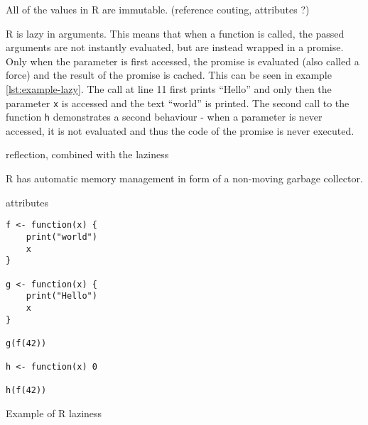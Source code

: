 

All of the values in R are immutable. (reference couting, attributes ?)

R is lazy in arguments. This means that when a function is called, the passed arguments are not instantly evaluated, but are instead wrapped in a promise. Only when the parameter is first accessed, the promise is evaluated (also called a force) and the result of the promise is cached. This can be seen in example \ref{lst:example-lazy}. The call at line 11 first prints \enquote{Hello} and only then the parameter \texttt{x} is accessed and the text \enquote{world} is printed. The second call to the function \texttt{h} demonstrates a second behaviour - when a parameter is never accessed, it is not evaluated and thus the code of the promise is never executed.

reflection, combined with the laziness

R has automatic memory management in form of a non-moving garbage collector.

attributes

\begin{listing}
	\centering
	\begin{verbatim}
f <- function(x) {
    print("world")
    x
}

g <- function(x) {
    print("Hello")
    x
}

g(f(42))

h <- function(x) 0

h(f(42))
    \end{verbatim}
	\caption{Example of R laziness}\label{lst:example-lazy}
\end{listing}
















\newpage

